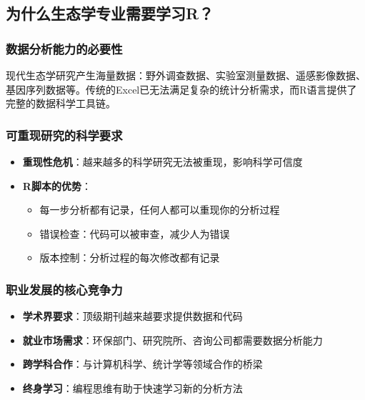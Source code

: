 \documentclass[
  twoside]{book}
\providecommand{\tightlist}{%
  \setlength{\itemsep}{0pt}\setlength{\parskip}{0pt}}
\begin{document}
\hypertarget{ux4e3aux4ec0ux4e48ux751fux6001ux5b66ux4e13ux4e1aux9700ux8981ux5b66ux4e60r}{%
\subsection{为什么生态学专业需要学习R？}\label{ux4e3aux4ec0ux4e48ux751fux6001ux5b66ux4e13ux4e1aux9700ux8981ux5b66ux4e60r}}

\hypertarget{ux6570ux636eux5206ux6790ux80fdux529bux7684ux5fc5ux8981ux6027}{%
\subsubsection{数据分析能力的必要性}\label{ux6570ux636eux5206ux6790ux80fdux529bux7684ux5fc5ux8981ux6027}}

现代生态学研究产生海量数据：野外调查数据、实验室测量数据、遥感影像数据、基因序列数据等。传统的Excel已无法满足复杂的统计分析需求，而R语言提供了完整的数据科学工具链。

\hypertarget{ux53efux91cdux73b0ux7814ux7a76ux7684ux79d1ux5b66ux8981ux6c42}{%
\subsubsection{可重现研究的科学要求}\label{ux53efux91cdux73b0ux7814ux7a76ux7684ux79d1ux5b66ux8981ux6c42}}

\begin{itemize}
\tightlist
\item
  \textbf{重现性危机}：越来越多的科学研究无法被重现，影响科学可信度
\item
  \textbf{R脚本的优势}：

  \begin{itemize}
  \tightlist
  \item
    每一步分析都有记录，任何人都可以重现你的分析过程
  \item
    错误检查：代码可以被审查，减少人为错误
  \item
    版本控制：分析过程的每次修改都有记录
  \end{itemize}
\end{itemize}

\hypertarget{ux804cux4e1aux53d1ux5c55ux7684ux6838ux5fc3ux7adeux4e89ux529b}{%
\subsubsection{职业发展的核心竞争力}\label{ux804cux4e1aux53d1ux5c55ux7684ux6838ux5fc3ux7adeux4e89ux529b}}

\begin{itemize}
\tightlist
\item
  \textbf{学术界要求}：顶级期刊越来越要求提供数据和代码
\item
  \textbf{就业市场需求}：环保部门、研究院所、咨询公司都需要数据分析能力
\item
  \textbf{跨学科合作}：与计算机科学、统计学等领域合作的桥梁
\item
  \textbf{终身学习}：编程思维有助于快速学习新的分析方法
\end{itemize}
\end{document}
